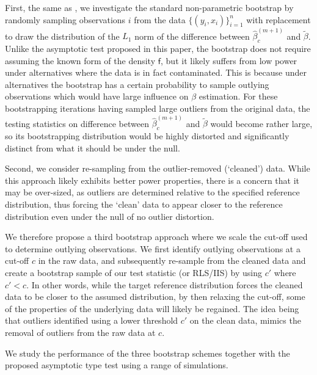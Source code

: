 \documentclass[11pt, letterpaper]{article}
\numberwithin{algorithm}{section}
\numberwithin{assumption}{section}
\numberwithin{lemma}{section}
\numberwithin{theorem}{section}
\numberwithin{corollary}{section}
\numberwithin{remark}{section}
\numberwithin{equation}{section}
\numberwithin{figure}{section}
\numberwithin{table}{section}
\begin{document}
First, the same as \cite{kaji2018switching}, we investigate the standard non-parametric bootstrap by randomly sampling observations $i$ from the data $\{(y_{i}, x_{i})\}_{i = 1}^{n}$ with replacement to draw the distribution of the $L_{1}$ norm of the difference between $\widehat{\beta}_{c}^{(m + 1)}$ and $\widetilde{\beta}$. Unlike the asymptotic test proposed in this paper, the bootstrap does not require assuming the known form of the density $\mathsf{f}$, but it likely suffers from low power under alternatives where the data is in fact contaminated. This is because under alternatives the bootstrap has a certain probability to sample outlying observations which would have large influence on $\beta$ estimation. For these bootstrapping iterations having sampled large outliers from the original data, the testing statistics on difference between $\widehat{\beta}_{c}^{(m + 1)}$ and $\widetilde{\beta}$ would become rather large, so its bootstrapping distribution would be highly distorted and significantly distinct from what it should be under the null.

Second, we consider re-sampling from the outlier-removed (`cleaned') data. While this approach likely exhibits better power properties, there is a concern that it may be over-sized, as outliers are determined relative to the specified reference distribution, thus forcing the `clean' data to appear closer to the reference distribution even under the null of no outlier distortion.

We therefore propose a third bootstrap approach where we scale the cut-off used to determine outlying observations. We first identify outlying observations at a cut-off $c$ in the raw data, and subsequently re-sample from the cleaned data and create a bootstrap sample of our test statistic (or RLS/IIS) by using $c'$ where $c' < c$. In other words, while the target reference distribution forces the cleaned data to be closer to the assumed distribution, by then relaxing the cut-off, some of the properties of the underlying data will likely be regained. The idea being that outliers identified using a lower threshold $c'$ on the clean data, mimics the removal of outliers from the raw data at $c$.

We study the performance of the three bootstrap schemes together with the proposed asymptotic type test using a range of simulations.



\end{document}

